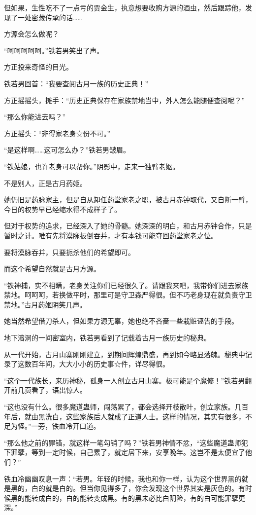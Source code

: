 \begin{this_body}
但如果，生性吃不了一点亏的贾金生，执意想要收购方源的酒虫，然后跟踪他，发现了一处密藏传承的话……

方源会怎么做呢？

“呵呵呵呵呵。”铁若男笑出了声。

方正投来奇怪的目光。

铁若男回首：“我要查阅古月一族的历史正典！”

方正摇摇头，摊手：“历史正典保存在家族禁地当中，外人怎么能随便查阅呢？”

“那么你能进去吗？”

方正摇头：“非得家老身☆份不可。”

“是这样啊……这可怎么办？”铁若男皱眉。

“铁姑娘，也许老身可以帮你。”阴影中，走来一独臂老妪。

不是别人，正是古月药姬。

她仍旧是药脉家主，但是自从卸任药堂家老之职，被古月赤钟取代，又自断一臂，今日的权势早已经缩水得不成样子了。

但对于权势的追求，已经深入了她的骨髓。她深深的明白，和古月赤钟合作，只是暂时之计。唯有先将漠脉扳倒吞并，才有本钱可能夺回药堂家老之位。

要将漠脉吞并，只要扼杀他们的希望即可。

而这个希望自然就是古月方源。

“铁神捕，实不相瞒，老身关注你们已经很久了。请跟我来吧，我带你们进去家族禁地。呵呵呵，若换做平时，那里可是守卫森严得很。但不巧老身现在就负责守卫禁地。”古月药姬阴笑几声。

她当然希望借刀杀人，但如果方源无辜，她也绝不吝啬一些栽赃诬告的手段。

地下溶洞的一间密室内，铁若男看到了记载着古月一族历史的秘典。

从一代开始，古月山寨刚刚建立，到期间辉煌鼎盛，再到如今略显落魄。秘典中记录了这数百年间，大大小小的历史事☆件，详尽得很。

“这个一代族长，来历神秘，孤身一人创立古月山寨。极可能是个魔修！”铁若男翻开前几页看了，语出惊人。

“这也没有什么。很多魔道蛊师，闯荡累了，都会选择开枝散叶，创立家族。几百年后，就由黑洗白，这些家族后人就成了正道人士。这样的情况，其实有很多，不足为怪。”一旁，铁血冷开口道。

“那么他之前的罪错，就这样一笔勾销了吗？”铁若男神情不忿，“这些魔道蛊师犯下罪孽，等到一定时候，自己累了，就定居下来，安享晚年。这岂不是太便宜了他们？”

铁血冷幽幽叹息一声：“若男。年轻的时候，我也和你一样，认为这个世界黑的就是黑的，白的就是白的。但当你见得多了，你会发现这个世界其实是灰色的。有时候黑的能转成白的，白的能转变成黑。有的黑未必比白阴险，有的白可能罪孽更深。”


\end{this_body}
